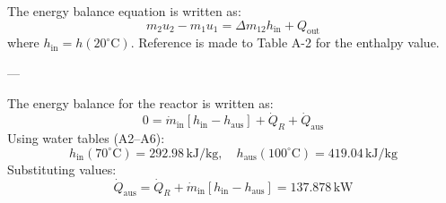 The energy balance equation is written as:  
\[
m_2 u_2 - m_1 u_1 = \Delta m_{12} h_{\text{in}} + Q_{\text{out}}
\]  
where \( h_{\text{in}} = h(20^\circ\text{C}) \). Reference is made to Table A-2 for the enthalpy value.

---

The energy balance for the reactor is written as:  
\[
0 = \dot{m}_{\text{in}} \left[ h_{\text{in}} - h_{\text{aus}} \right] + \dot{Q}_R + \dot{Q}_{\text{aus}}
\]  
Using water tables (A2–A6):  
\[
h_{\text{in}} (70^\circ\text{C}) = 292.98 \, \text{kJ/kg}, \quad h_{\text{aus}} (100^\circ\text{C}) = 419.04 \, \text{kJ/kg}
\]  
Substituting values:  
\[
\dot{Q}_{\text{aus}} = \dot{Q}_R + \dot{m}_{\text{in}} \left[ h_{\text{in}} - h_{\text{aus}} \right] = 137.878 \, \text{kW}
\]
